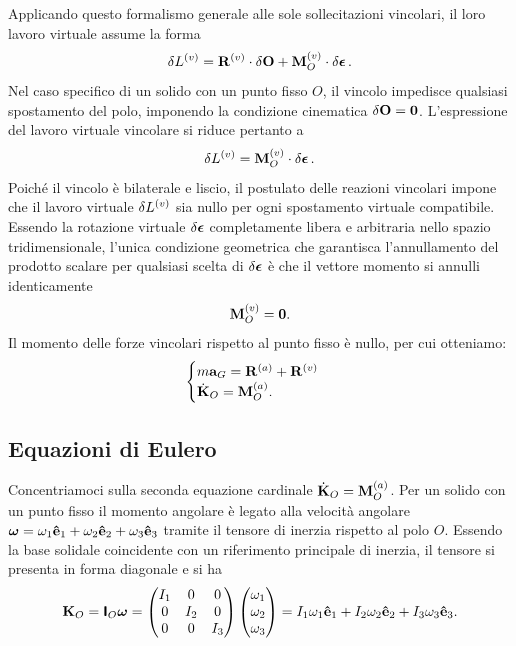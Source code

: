 Applicando questo formalismo generale alle sole sollecitazioni vincolari, il loro lavoro virtuale assume la forma
\begin{equation*}
    \var{L^{(v)}} = \vb{R}^{(v)} \cdot \var{\vb{O}} + \vb{M}_O^{(v)} \cdot \var{\vb*{\epsilon}}.
\end{equation*}
Nel caso specifico di un solido con un punto fisso $O$, il vincolo impedisce qualsiasi spostamento del polo, imponendo la condizione cinematica $\var{\vb{O}} = \vb{0}$. L'espressione del lavoro virtuale vincolare si riduce pertanto a
\begin{equation*}
    \var{L^{(v)}} = \vb{M}_O^{(v)} \cdot \var{\vb*{\epsilon}}.
\end{equation*}
Poiché il vincolo è bilaterale e liscio, il postulato delle reazioni vincolari impone che il lavoro virtuale $\var{L^{(v)}}$ sia nullo per ogni spostamento virtuale compatibile. Essendo la rotazione virtuale $\var{\vb*{\epsilon}}$ completamente libera e arbitraria nello spazio tridimensionale, l'unica condizione geometrica che garantisca l'annullamento del prodotto scalare per qualsiasi scelta di $\var{\vb*{\epsilon}}$ è che il vettore momento si annulli identicamente
\begin{equation*}
    \vb{M}_O^{(v)} = \vb{0}.
\end{equation*}
Il momento delle forze vincolari rispetto al punto fisso è nullo, per cui otteniamo:
\begin{equation*}
    \begin{cases}
        m\vb{a}_G = \vb{R}^{(a)} + \vb{R}^{(v)} \\
        \dot{\vb{K}}_O = \vb{M}_O^{(a)}.
    \end{cases}
\end{equation*}

\subsection{Equazioni di Eulero}
Concentriamoci sulla seconda equazione cardinale $\dot{\vb{K}}_O = \vb{M}_O^{(a)}$. Per un solido con un punto fisso il momento angolare è legato alla velocità angolare $\vb*{\omega} = \omega_1 \vu{e}_1 + \omega_2 \vu{e}_2 + \omega_3 \vu{e}_3$ tramite il tensore di inerzia rispetto al polo $O$. Essendo la base solidale coincidente con un riferimento principale di inerzia, il tensore si presenta in forma diagonale e si ha
\begin{equation*}
    \vb{K}_O = \boldsymbol{\mathsf{I}}_O \vb*{\omega} = \begin{pmatrix}
        I_{1} & 0 & 0 \\
        0 & I_{2} & 0 \\
        0 & 0 & I_{3}
    \end{pmatrix}
    \begin{pmatrix}
        \omega_1 \\
        \omega_2 \\
        \omega_3
    \end{pmatrix} =
    I_1 \omega_1 \vu{e}_1 + I_2 \omega_2 \vu{e}_2 + I_3 \omega_3 \vu{e}_3.
\end{equation*}

